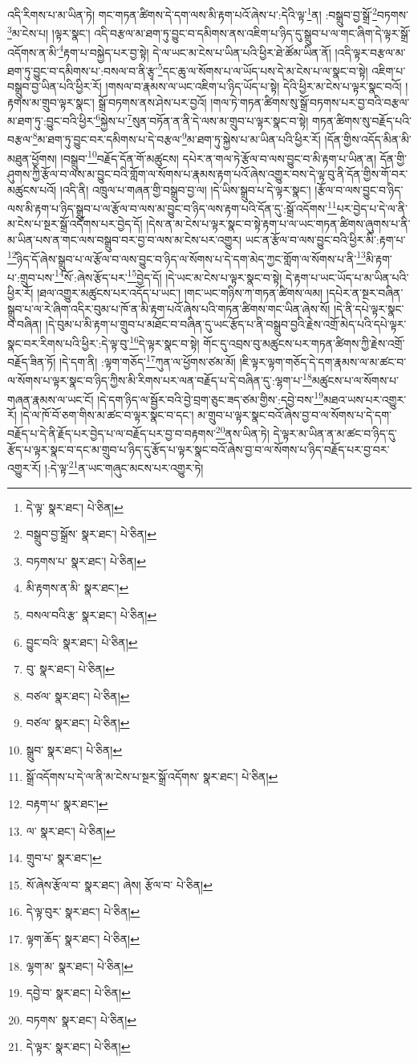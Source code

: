 འདི་རིགས་པ་མ་ཡིན་ཏེ། གང་གཏན་ཚིགས་དེ་དག་ལས་མི་རྟག་པའོ་ཞེས་པ་:དེའི་ལྟ་\footnote{དེ་ལྟ་  སྣར་ཐང་།  པེ་ཅིན། }ན། :བསྒྲུབ་བྱ་སྒྲོ་\footnote{བསྒྲུབ་བྱ་སྒྲོས་  སྣར་ཐང་།  པེ་ཅིན། }བཏགས་\footnote{བཏགས་པ་  སྣར་ཐང་།  པེ་ཅིན། }མ་ངེས་པ། །ལྟར་སྣང་། འདི་བརྩལ་མ་ཐག་ཏུ་བྱུང་བ་དམིགས་ནས་འཇིག་པ་ཉིད་དུ་སྒྲུབ་པ་ལ་གང་ཞིག་དེ་ལྟར་སྒྲོ་འདོགས་ན་མི་\footnote{མི་རྟགས་ན་མི་  སྣར་ཐང་། }རྟག་པ་བསྐྱེད་པར་བྱ་སྟེ། དེ་ལ་ཡང་མ་ངེས་པ་ཡིན་པའི་ཕྱིར་ཐེ་ཚོམ་ཡིན་ནོ། །འདི་ལྟར་བརྩལ་མ་ཐག་ཏུ་བྱུང་བ་དམིགས་པ་:བསལ་བ་ནི་རྩྭ་\footnote{བསལ་བའི་རྩ་  སྣར་ཐང་།  པེ་ཅིན། }དང་ཆུ་ལ་སོགས་པ་ལ་ཡོད་པས་དེ་མ་ངེས་པ་ལ་སྣང་བ་སྟེ། འཇིག་པ་བསྒྲུབ་བྱ་ཡིན་པའི་ཕྱིར་རོ། །གསལ་བ་རྣམས་ལ་ཡང་འཇིག་པ་ཉིད་ཡོད་པ་སྟེ། དེའི་ཕྱིར་མ་ངེས་པ་ལྟར་སྣང་བའོ། །རྟགས་མ་གྲུབ་ལྟར་སྣང་། སྒྲོ་བཏགས་ནས་ཤེས་པར་བྱའོ། །གལ་ཏེ་གཏན་ཚིགས་སུ་སྒྲོ་བཏགས་པར་བྱ་བའི་བརྩལ་མ་ཐག་ཏུ་:བྱུང་བའི་ཕྱིར་\footnote{བྱུང་བའི་  སྣར་ཐང་།  པེ་ཅིན། }སྐྱེས་པ་\footnote{བུ་  སྣར་ཐང་།  པེ་ཅིན། }སུན་བཏོན་ན་ནི་དེ་ལས་མ་གྲུབ་པ་ལྟར་སྣང་བ་སྟེ། གཏན་ཚིགས་སུ་བརྗོད་པའི་བརྩལ་\footnote{བཙལ་  སྣར་ཐང་།  པེ་ཅིན། }མ་ཐག་ཏུ་བྱུང་བར་དམིགས་པ་དེ་བརྩལ་\footnote{བཙལ་  སྣར་ཐང་།  པེ་ཅིན། }མ་ཐག་ཏུ་སྐྱེས་པ་མ་ཡིན་པའི་ཕྱིར་རོ། །དོན་གྱིས་འདོད་མིན་མི་མཐུན་ཕྱོགས། །བསྒྲུབ་\footnote{སྒྲུབ་  སྣར་ཐང་།  པེ་ཅིན། }བརྗོད་དོན་གོ་མཚུངས། དཔེར་ན་གལ་ཏེ་རྩོལ་བ་ལས་བྱུང་བ་མི་རྟག་པ་ཡིན་ན། དོན་གྱི་ཤུགས་ཀྱི་རྩོལ་བ་ལས་མ་བྱུང་བའི་གློག་ལ་སོགས་པ་རྣམས་རྟག་པའོ་ཞེས་འགྱུར་བས་དེ་ལྟ་བུ་ནི་དོན་གྱིས་གོ་བར་མཚུངས་པའོ། །འདི་ནི། འཁྲུལ་པ་གཞན་གྱི་བསྒྲུབ་བྱ་ལ། །དེ་ཡིས་སྒྲུབ་པ་དེ་ལྟར་སྣང་། །རྩོལ་བ་ལས་བྱུང་བ་ཉིད་ལས་མི་རྟག་པ་ཉིད་སྒྲུབ་པ་ལ་རྩོལ་བ་ལས་མ་བྱུང་བ་ཉིད་ལས་རྟག་པའི་དོན་དུ་:སྒྲོ་འདོགས་\footnote{སྒྲོ་འདོགས་པ་དེ་ལ་ནི་མ་ངེས་པ་སྔར་སྒྲོ་འདོགས་  སྣར་ཐང་།  པེ་ཅིན། }པར་བྱེད་པ་དེ་ལ་ནི་མ་ངེས་པ་སྔར་སྒྲོ་འདོགས་པར་བྱེད་དོ། །དེས་ན་མ་ངེས་པ་ལྟར་སྣང་བ་སྟེ་རྟག་པ་ལ་ཡང་གཏན་ཚིགས་ཞུགས་པ་ནི་མ་ཡིན་པས་ན་གང་ལས་བསྒྲུབ་བར་བྱ་བ་ལས་མ་ངེས་པར་འགྱུར། ཡང་ན་རྩོལ་བ་ལས་བྱུང་བའི་ཕྱིར་མི་:རྟག་པ་\footnote{བརྟག་པ་  སྣར་ཐང་། }ཉིད་དོ་ཞེས་སྒྲུབ་པ་ལ་རྩོལ་བ་ལས་བྱུང་བ་ཉིད་ལ་སོགས་པ་དེ་དག་མེད་ཀྱང་གློག་ལ་སོགས་པ་ནི་\footnote{ལ་  སྣར་ཐང་།  པེ་ཅིན། }མི་རྟག་པ་:གྲུབ་པས་\footnote{གྲུབ་པ་  སྣར་ཐང་། }སོ་:ཞེས་རྩོད་པར་\footnote{སོ་ཞེས་རྩོལ་བ་  སྣར་ཐང་། ཞེས། རྩོལ་བ་  པེ་ཅིན། }བྱེད་དོ། །དེ་ཡང་མ་ངེས་པ་ལྟར་སྣང་བ་སྟེ། དེ་རྟག་པ་ཡང་ཡོད་པ་མ་ཡིན་པའི་ཕྱིར་རོ། །ཐལ་འགྱུར་མཚུངས་པར་འདོད་པ་ཡང་། །གང་ཡང་གཉིས་ཀ་གཏན་ཚིགས་ལམ། །དཔེར་ན་སྔར་བཞིན་སྒྲུབ་པ་ལ་རེ་ཞིག་འདིར་བུམ་པ་ཁོ་ན་མི་རྟག་པའོ་ཞེས་པའི་གཏན་ཚིགས་གང་ཡིན་ཞེས་སོ། །དེ་ནི་དཔེ་ལྟར་སྣང་བ་བཞིན། །དེ་བུམ་པ་མི་རྟག་པ་གྲུབ་པ་མཐོང་བ་བཞིན་དུ་ཡང་རྩོད་པ་ནི་བསྒྲུབ་བྱའི་རྗེས་འགྲོ་མེད་པའི་དཔེ་ལྟར་སྣང་བར་རིགས་པའི་ཕྱིར་:དེ་ལྟ་བུ་\footnote{དེ་ལྟ་བུར་  སྣར་ཐང་།  པེ་ཅིན། }དེ་ལྟར་སྣང་བ་སྟེ། གོང་དུ་འབྲས་བུ་མཚུངས་པར་གཏན་ཚིགས་ཀྱི་རྗེས་འགྲོ་བརྗོད་ཟིན་ཏོ། །དེ་དག་ནི། :ལྟག་གཅོད་\footnote{ལྟག་ཆོད་  སྣར་ཐང་།  པེ་ཅིན། }ཀུན་ལ་ཕྱོགས་ཙམ་མོ། །ཇི་ལྟར་ལྟག་གཅོད་དེ་དག་རྣམས་ལ་མ་ཚང་བ་ལ་སོགས་པ་ལྟར་སྣང་བ་ཉིད་ཀྱིས་མི་རིགས་པར་ལན་བརྗོད་པ་དེ་བཞིན་དུ་:ལྷག་པ་\footnote{ལྷག་མ་  སྣར་ཐང་།  པེ་ཅིན། }མཚུངས་པ་ལ་སོགས་པ་གཞན་རྣམས་ལ་ཡང་ངོ། །དེ་དག་ཉིད་ལ་སྦྱོར་བའི་བྱེ་བྲག་ཅུང་ཟད་ཙམ་གྱིས་:དབྱེ་བས་\footnote{དབྱེ་བ་  སྣར་ཐང་།  པེ་ཅིན། }མཐའ་ཡས་པར་འགྱུར་རོ། །དེ་ལ་ཁོ་བོ་ཅག་གིས་མ་ཚང་བ་ལྟར་སྣང་བ་དང་། མ་གྲུབ་པ་ལྟར་སྣང་བའོ་ཞེས་བྱ་བ་ལ་སོགས་པ་དེ་དག་བརྗོད་པ་དེ་ནི་རྗོད་པར་བྱེད་པ་ལ་བརྗོད་པར་བྱ་བ་བརྟགས་\footnote{བཏགས་  སྣར་ཐང་།  པེ་ཅིན། }ནས་ཡིན་ཏེ། དེ་ལྟར་མ་ཡིན་ན་མ་ཚང་བ་ཉིད་དུ་རྩོད་པ་ལྟར་སྣང་བ་དང་མ་གྲུབ་པ་ཉིད་དུ་རྩོད་པ་ལྟར་སྣང་བའོ་ཞེས་བྱ་བ་ལ་སོགས་པ་ཉིད་བརྗོད་པར་བྱ་བར་འགྱུར་རོ། །:དེ་ལྟ་\footnote{དེ་ལྟར་  སྣར་ཐང་།  པེ་ཅིན། }ན་ཡང་གཞུང་མངས་པར་འགྱུར་ཏེ། 
